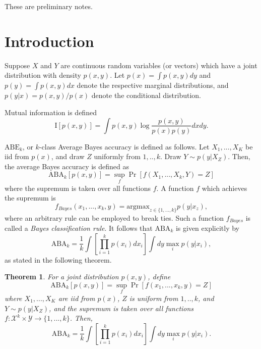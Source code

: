 \documentclass[12pt]{article}
\begin{document}
\maketitle

\newcommand{\tr}{\text{tr}}
\newcommand{\E}{\textbf{E}}
\newcommand{\diag}{\text{diag}}
\newcommand{\argmax}{\text{argmax}}
\newcommand{\Cov}{\text{Cov}}
\newcommand{\Var}{\text{Var}}
\newcommand{\argmin}{\text{argmin}}
\newcommand{\Vol}{\text{Vol}}
\newcommand{\comm}[1]{}
\newtheorem{theorem}{Theorem}[section]
\newtheorem{corollary}{Corollary}[theorem]
\newtheorem{lemma}[theorem]{Lemma}

These are preliminary notes.

\section{Introduction}

Suppose $X$ and $Y$ are continuous random variables (or vectors) which have a joint distribution with density $p(x, y)$.
Let $p(x) = \int p(x,y) dy$ and $p(y) = \int p(x,y) dx$ denote the respective marginal distributions,
and $p(y|x) = p(x,y)/p(x)$ denote the conditional distribution.

Mutual information is defined
\[
\text{I}[p(x, y)] = \int p(x, y) \log \frac{p(x, y)}{p(x)p(y)} dx dy.
\]

$\text{ABE}_k$, or $k$-class Average Bayes accuracy is defined as follows.  Let $X_1,...,X_K$ be iid from $p(x)$,
and draw $Z$ uniformly from $1,..,k$.  Draw $Y \sim p(y|X_Z)$.
Then, the average Bayes accuracy is defined as
\[
\text{ABA}_k[p(x, y)] = \sup_f \Pr[f(X_1,...,X_k, Y) = Z] 
\]
where the supremum is taken over all functions $f$.  A function $f$ which achieves the supremum is
\[
f_{Bayes}(x_1,...,x_k, y) = \text{argmax}_{z \in \{1,...,k\}} p(y|x_z),
\]
where an arbitrary rule can be employed to break ties.
Such a function $f_{Bayes}$ is called a \emph{Bayes classification rule}.
It follows that $\text{ABA}_k$ is given explicitly by
\[
\text{ABA}_k = \frac{1}{k} \int \left[\prod_{i=1}^k p(x_i) dx_i \right] \int dy \max_i p(y|x_i),
\]
as stated in the following theorem.

\begin{theorem}
For a joint distribution $p(x, y)$, define
\[
\text{ABA}_k[p(x, y)] = \sup_f \Pr[f(x_1,...,x_k, y) = Z] 
\]
where $X_1,...,X_K$ are iid from $p(x)$, $Z$ is uniform from $1,..,k$, and $Y \sim p(y|X_Z)$,
and the supremum is taken over all functions $f: \mathcal{X}^k\times \mathcal{Y} \to \{1,...,k\}$.
Then,
\[
\text{ABA}_k = \frac{1}{k} \int \left[\prod_{i=1}^k p(x_i) dx_i \right] \int dy \max_i p(y|x_i).
\]
\end{theorem}
\end{document}
